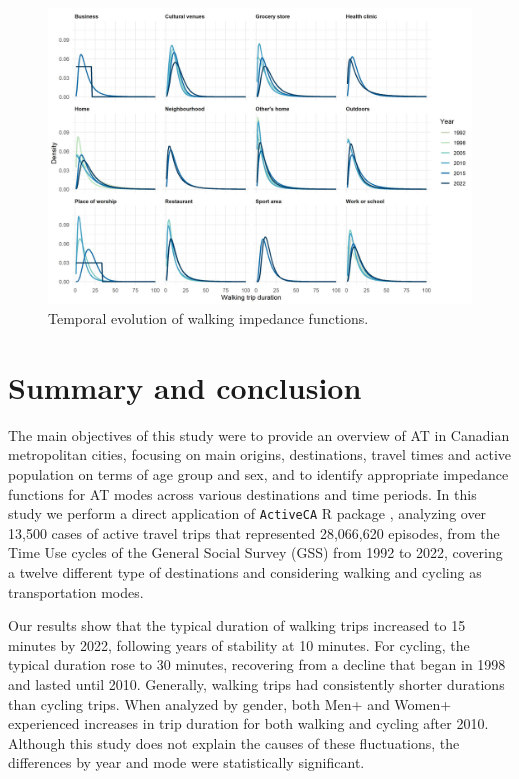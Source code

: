 \documentclass[preprint, 3p,
authoryear]{elsarticle} %
\begin{document}
\begin{figure}

{\centering \includegraphics[width=1\linewidth]{figures/walking_temporal_evolution} 

}

\caption{Temporal evolution of walking impedance functions.}\label{fig:walking-evolution-fig}
\end{figure}

\section{Summary and conclusion}\label{summary-and-conclusion}

The main objectives of this study were to provide an overview of AT in
Canadian metropolitan cities, focusing on main origins, destinations,
travel times and active population on terms of age group and sex, and to
identify appropriate impedance functions for AT modes across various
destinations and time periods. In this study we perform a direct
application of \texttt{ActiveCA} R package \citep{dossantos2025},
analyzing over 13,500 cases of active travel trips that represented
28,066,620 episodes, from the Time Use cycles of the General Social
Survey (GSS) from 1992 to 2022, covering a twelve different type of
destinations and considering walking and cycling as transportation
modes.

Our results show that the typical duration of walking trips increased to
15 minutes by 2022, following years of stability at 10 minutes. For
cycling, the typical duration rose to 30 minutes, recovering from a
decline that began in 1998 and lasted until 2010. Generally, walking
trips had consistently shorter durations than cycling trips. When
analyzed by gender, both Men+ and Women+ experienced increases in trip
duration for both walking and cycling after 2010. Although this study
does not explain the causes of these fluctuations, the differences by
year and mode were statistically significant.
\end{document}
